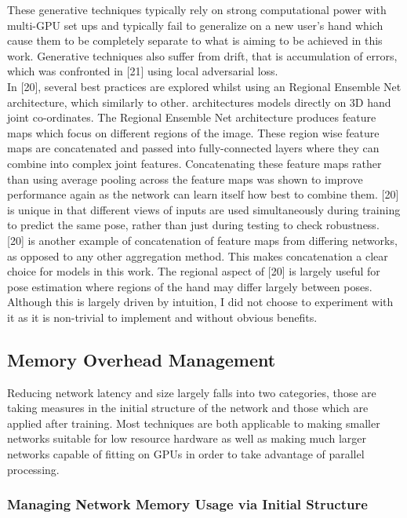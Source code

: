 \documentclass{article}
\begin{document}
These generative techniques typically rely on strong computational power with multi-GPU set ups and typically fail to generalize on a new user's hand which cause them to be completely separate to what is aiming to be achieved in this work. Generative techniques also suffer from drift, that is accumulation of errors, which was confronted in [21] using local adversarial loss.\\ 

In [20], several best practices are explored whilst using an Regional Ensemble Net architecture, which similarly to other. architectures models directly on 3D hand joint co-ordinates. The Regional Ensemble Net architecture produces feature maps which focus on different regions of the image. These region wise feature maps are concatenated and passed into fully-connected layers where they can combine into complex joint features. Concatenating these feature maps rather than using average pooling across the feature maps was shown to improve performance again as the network can learn itself how best to combine them. [20] is unique in that different views of inputs are used simultaneously during training to predict the same pose, rather than just during testing to check robustness. \\

[20] is another example of concatenation of feature maps from differing networks, as opposed to any other aggregation method. This makes concatenation a clear choice for models in this work. The regional aspect of [20] is largely useful for pose estimation where regions of the hand may differ largely between poses. Although this is largely driven by intuition, I did not choose to experiment with it as it is non-trivial to implement and without obvious benefits. \\

\subsection{Memory Overhead Management}
Reducing network latency and size largely falls into two categories, those are taking measures in the initial structure of the network and those which are applied after training. Most techniques are both applicable to making smaller networks suitable for low resource hardware as well as making much larger networks capable of fitting on GPUs in order to take advantage of parallel processing.

\subsubsection{Managing Network Memory Usage via Initial Structure}
\end{document}
